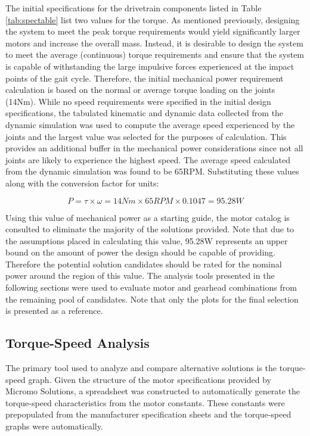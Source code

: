 The initial specifications for the drivetrain components listed in Table \ref{tab:spectable} list two values for the torque. As mentioned previously, designing the system to meet the peak torque requirements would yield significantly larger motors and increase the overall mass. Instead, it is desirable to design the system to meet the average (continuous) torque requirements and ensure that the system is capable of withstanding the large impulsive forces experienced at the impact points of the gait cycle. Therefore, the initial mechanical power requirement calculation is based on the normal or average torque loading on the joints (14Nm). While no speed requirements were specified in the initial design specifications, the tabulated kinematic and dynamic data collected from the dynamic simulation was used to compute the average speed experienced by the joints and the largest value was selected for the purposes of calculation. This provides an additional buffer in the mechanical power considerations since not all joints are likely to experience the highest speed. The average speed calculated from the dynamic simulation was found to be 65RPM. Substituting these values along with the conversion factor for units: 

\begin{equation}
	P = \tau \times \omega = 14Nm \times 65RPM \times 0.1047 = 95.28W
\end{equation}

Using this value of mechanical power as a starting guide, the motor catalog is consulted to eliminate the majority of the solutions provided. Note that due to the assumptions placed in calculating this value, 95.28W represents an upper bound on the amount of power the design should be capable of providing. Therefore the potential solution candidates should be rated for the nominal power around the region of this value. The analysis tools presented in the following sections were used to evaluate motor and gearhead combinations from the remaining pool of candidates. Note that only the plots for the final selection is presented as a reference.

\subsection{Torque-Speed Analysis} %
\label{sub:torque_speed_analysis}
The primary tool used to analyze and compare alternative solutions is the torque-speed graph. Given the structure of the motor specifications provided by Micromo Solutions, a spreadsheet was constructed to automatically generate the torque-speed characteristics from the motor constants. These constants were prepopulated from the manufacturer specification sheets and the torque-speed graphs were automatically. 

